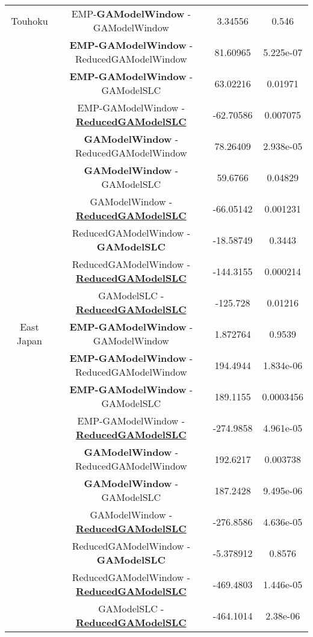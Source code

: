 \begin{table*}[]
\begin{center}
\begin{tabular}{|c|c|c|c|}
      \hline
      Touhoku & EMP-\textbf{GAModelWindow} - GAModelWindow &
      3.34556 & 0.546\\
      & \textbf{EMP-GAModelWindow} - ReducedGAModelWindow &
      81.60965 & 5.225e-07\\
      &	\textbf{EMP-GAModelWindow} - GAModelSLC &
      63.02216 &0.01971\\
      & EMP-GAModelWindow - \underline{\textbf{ReducedGAModelSLC}} &
      -62.70586 & 0.007075\\
      & \textbf{GAModelWindow} - ReducedGAModelWindow & 
      78.26409 & 2.938e-05\\
      & \textbf{GAModelWindow} - GAModelSLC &
      59.6766 & 0.04829\\
      & GAModelWindow - \underline{\textbf{ReducedGAModelSLC}} &
      -66.05142 &0.001231\\
      & ReducedGAModelWindow - \textbf{GAModelSLC} &
      -18.58749 & 0.3443\\
      & ReducedGAModelWindow - \underline{\textbf{ReducedGAModelSLC}} &
      -144.3155 & 0.000214\\
      & GAModelSLC - \underline{\textbf{ReducedGAModelSLC}} &
      -125.728 &0.01216\\
      
      
      \hline
      East Japan & \textbf{EMP-GAModelWindow} - GAModelWindow &
      1.872764  & 0.9539\\
      
      & \textbf{EMP-GAModelWindow} - ReducedGAModelWindow &
      194.4944 & 1.834e-06\\
      & \textbf{EMP-GAModelWindow} - GAModelSLC &
      189.1155 & 0.0003456\\
      & EMP-GAModelWindow - \underline{\textbf{ReducedGAModelSLC}} &
      -274.9858 & 4.961e-05\\
      & \textbf{GAModelWindow} - ReducedGAModelWindow &
      192.6217 & 0.003738\\
      & \textbf{GAModelWindow} - GAModelSLC &
      187.2428 &9.495e-06\\
      & GAModelWindow - \underline{\textbf{ReducedGAModelSLC}} &
      -276.8586 & 4.636e-05\\
      & ReducedGAModelWindow - \textbf{GAModelSLC} & 
      -5.378912 & 0.8576\\
      & ReducedGAModelWindow - \underline{\textbf{ReducedGAModelSLC}} &
      -469.4803 & 1.446e-05\\
      & GAModelSLC - \underline{\textbf{ReducedGAModelSLC}} &
      -464.1014  & 2.38e-06\\
      

\end{tabular}
\end{center}
\end{table*}
